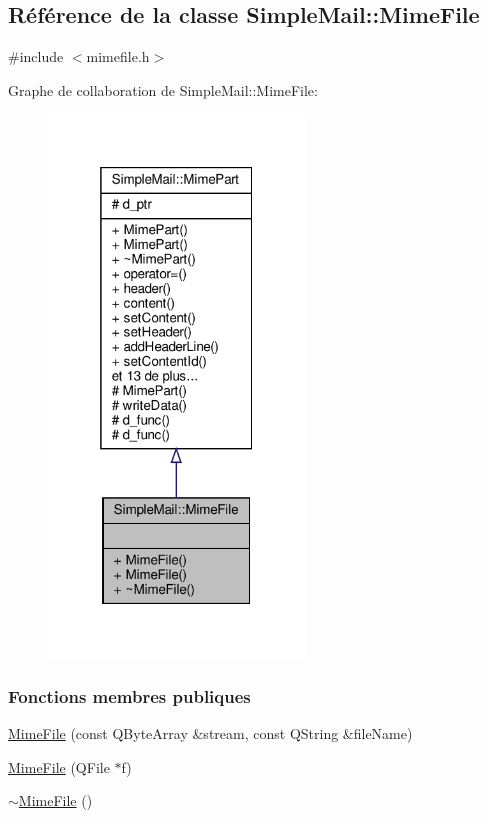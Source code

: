 \hypertarget{class_simple_mail_1_1_mime_file}{}\subsection{Référence de la classe Simple\+Mail\+:\+:Mime\+File}
\label{class_simple_mail_1_1_mime_file}


{\ttfamily \#include $<$mimefile.\+h$>$}



Graphe de collaboration de Simple\+Mail\+:\+:Mime\+File\+:\nopagebreak
\begin{figure}[H]
\begin{center}
\leavevmode
\includegraphics[width=193pt]{class_simple_mail_1_1_mime_file__coll__graph}
\end{center}
\end{figure}
\subsubsection*{Fonctions membres publiques}
\begin{DoxyCompactItemize}
\item 
\hyperlink{class_simple_mail_1_1_mime_file_a813f54f8423832b33fac1a85820bdb4a}{Mime\+File} (const Q\+Byte\+Array \&stream, const Q\+String \&file\+Name)
\item 
\hyperlink{class_simple_mail_1_1_mime_file_a4bf2724afb5a33a7dcdd8a4c9b250c7c}{Mime\+File} (Q\+File $\ast$f)
\item 
\hyperlink{class_simple_mail_1_1_mime_file_ac431f1ff557b1620611256cf05c9058d}{$\sim$\+Mime\+File} ()
\end{DoxyCompactItemize}
